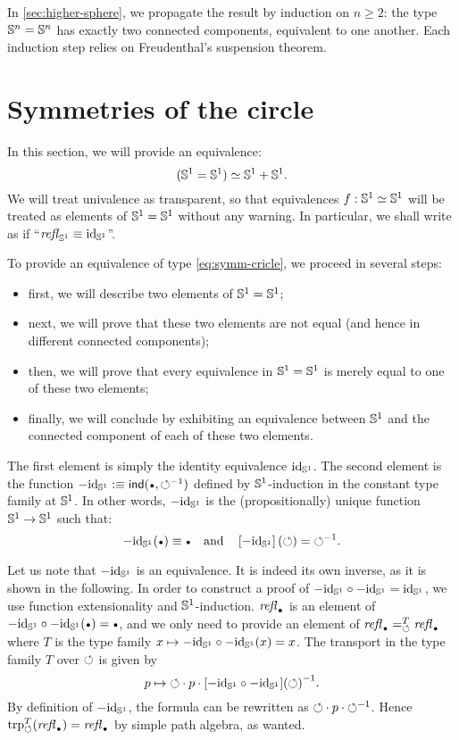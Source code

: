 \documentclass[english,a4]{article}
\renewcommand{\ap}[1]{\left[{#1}\right]}
\begin{document}
In \cref{sec:higher-sphere}, we propagate the result by induction on
$n\geq 2$: the type ${\mathbb S^{n}} = {\mathbb S^{n}}$ has exactly two connected
components, equivalent to one another. Each induction step relies on
Freudenthal's suspension theorem.

\section{Symmetries of the circle}
\label{sec:circle-case}%

In this section, we will provide an equivalence:
\begin{equation}
  \label{eq:symm-cricle}%
  (\Sc = \Sc) \weq \Sc+\Sc.
\end{equation}
We will treat univalence as transparent, so that equivalences
$f:{{\mathbb S^{1}}}\simeq {{\mathbb S^{1}}}$ will be treated as elements of ${{\mathbb S^{1}}}={{\mathbb S^{1}}}$ without any
warning. In particular, we shall write as if
``$\mathop{{\mathit{refl}}_{{{\mathbb S^{1}}}}} \equiv \mathord{\mathrm{id}}_{{\mathbb S^{1}}}$''.

To provide an equivalence of type \cref{eq:symm-cricle}, we proceed
in several steps:
\begin{itemize}
\item first, we will describe two elements of ${{\mathbb S^{1}}}={{\mathbb S^{1}}}$;
\item next, we will prove that these two elements are not equal (and
hence in different connected components);
\item then, we will prove that every equivalence in ${{\mathbb S^{1}}}={{\mathbb S^{1}}}$ is
  merely equal to one of these two elements;
\item finally, we will conclude by exhibiting an equivalence between
  ${{\mathbb S^{1}}}$ and the connected component of each of these two elements.
\end{itemize}

The first element is simply the identity equivalence $\mathord{\mathrm{id}}_{{\mathbb S^{1}}}$. The
second element is the function
$-\id_\Sc \defequi \ind(\base,\inv{\Sloop})$ defined by
${{\mathbb S^{1}}}$-induction in the constant type family at ${{\mathbb S^{1}}}$. In other words,
$-\mathord{\mathrm{id}}_{{\mathbb S^{1}}}$ is the (propositionally) unique function ${{\mathbb S^{1}}} \to {{\mathbb S^{1}}}$ such
that:
\begin{displaymath}
  -\id_\Sc(\base) \jdeq \base%
  \quad\text{and}\quad%
  \ap{-\id_\Sc}(\Sloop) = \inv{\Sloop}.
\end{displaymath}

Let us note that $-\mathord{\mathrm{id}}_{{\mathbb S^{1}}}$ is an equivalence. It is indeed its own inverse, as
it is shown in the following. In order to construct a proof of $-\mathord{\mathrm{id}}_{{\mathbb S^{1}}} \circ
-\mathord{\mathrm{id}}_{{\mathbb S^{1}}} = \mathord{\mathrm{id}}_{{\mathbb S^{1}}}$, we use function extensionality and ${{\mathbb S^{1}}}$-induction.
$\refl\base$ is an element of $-\id_\Sc\circ -\id_\Sc (\base) = \base$, and
we only need to provide an element of $\pathover {\refl\base} T \Sloop
{\refl\base}$ where $T$ is the type family $x \mapsto -\mathord{\mathrm{id}}_{{\mathbb S^{1}}} \circ -\mathord{\mathrm{id}}_{{\mathbb S^{1}}} (x)
= x$. The transport in the type family $T$ over $\mathord{\circlearrowleft}$ is given by
\begin{displaymath}
  p \mapsto \mathord{\circlearrowleft} \cdot p \cdot {[-\mathord{\mathrm{id}}_{{\mathbb S^{1}}}\circ -\mathord{\mathrm{id}}_{{\mathbb S^{1}}}](\mathord{\circlearrowleft})}^{-1}.
\end{displaymath}
By definition of $-\mathord{\mathrm{id}}_{{\mathbb S^{1}}}$, the formula can be rewritten as $\mathord{\circlearrowleft} \cdot p
\cdot {\mathord{\circlearrowleft}}^{-1}$.  Hence $\trp[T] \Sloop (\refl\base) = \refl\base$ by simple
path algebra, as wanted. 
\end{document}
